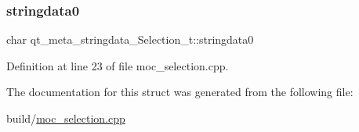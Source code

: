\mbox{\label{structqt__meta__stringdata___selection__t_aebaf48c958bfda11e969b41fc7e0a2eb}} 
\subsubsection{\texorpdfstring{stringdata0}{stringdata0}}
{\footnotesize\ttfamily char qt\+\_\+meta\+\_\+stringdata\+\_\+\+Selection\+\_\+t\+::stringdata0}



Definition at line 23 of file moc\+\_\+selection.\+cpp.



The documentation for this struct was generated from the following file\+:\begin{DoxyCompactItemize}
\item 
build/\mbox{\hyperlink{build_2moc__selection_8cpp}{moc\+\_\+selection.\+cpp}}\end{DoxyCompactItemize}
